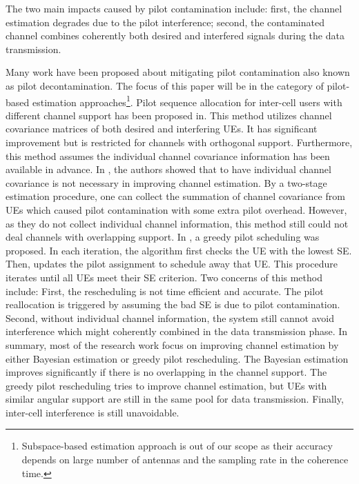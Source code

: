 The two main impacts caused by pilot contamination include: first, the channel estimation degrades due to the pilot interference; second, the contaminated channel combines coherently both desired and interfered signals during the data transmission. 

Many work have been proposed about mitigating pilot contamination also known as pilot decontamination. The focus of this paper will be in the category of pilot-based estimation approaches\cite{elijah2016comprehensive}\footnote{Subspace-based estimation approach is out of our scope as their accuracy depends on large number of antennas and the sampling rate in the coherence time.}. Pilot sequence allocation for inter-cell users with different channel support has been proposed in\cite{yin2013coordinated,adhikary2013joint,you2015pilot}. This method utilizes channel covariance matrices of both desired and interfering UEs. It has significant improvement but is restricted for channels with orthogonal support. Furthermore, this method assumes the individual channel covariance information has been available in advance. In \cite{bjornson2016massive}, the authors showed that to have individual channel covariance is not necessary in improving channel estimation. By a two-stage estimation procedure, one can collect the summation of channel covariance from UEs which caused pilot contamination with some extra pilot overhead. However, as they do not collect individual channel information, this method still could not deal channels with overlapping support. In \cite{ngo2017cell}, a greedy pilot scheduling was proposed. In each iteration, the algorithm first checks the UE with the lowest SE. Then, updates the pilot assignment to schedule away that UE. This procedure iterates until all UEs meet their SE criterion. Two concerns of this method include: First, the rescheduling is not time efficient and accurate. The pilot reallocation is triggered by assuming the bad SE is due to pilot contamination. Second, without individual channel information, the system still cannot avoid interference which might coherently combined in the data transmission phase. In summary, most of the research work focus on improving channel estimation by either Bayesian estimation or greedy pilot rescheduling. The Bayesian estimation improves significantly if there is no overlapping in the channel support. The greedy pilot rescheduling tries to improve channel estimation, but UEs with similar angular support are still in the same pool for data transmission. Finally, inter-cell interference is still unavoidable.


